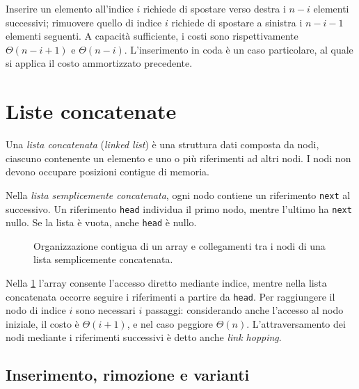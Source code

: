 Inserire un elemento all'indice \(i\) richiede di spostare verso
destra i \(n-i\) elementi successivi; rimuovere quello di indice
\(i\) richiede di spostare a sinistra i \(n-i-1\) elementi seguenti.
A capacità sufficiente, i costi sono rispettivamente
\(\Theta(n-i+1)\) e \(\Theta(n-i)\). L'inserimento in coda
è un caso particolare, al quale si applica il costo ammortizzato
precedente.

\section{Liste concatenate}
\label{sec:fi-liste-concatenate}

\begin{definition}
\label{def:fi-lista-concatenata}
Una \emph{lista concatenata} (\emph{linked list}) è una struttura
dati composta da nodi, ciascuno contenente un elemento e uno o
più riferimenti ad altri nodi. I nodi non devono occupare
posizioni contigue di memoria.
\end{definition}

Nella \emph{lista semplicemente concatenata}, ogni nodo contiene
un riferimento \texttt{next} al successivo. Un riferimento
\texttt{head} individua il primo nodo, mentre l'ultimo ha
\texttt{next} nullo. Se la lista è vuota, anche \texttt{head}
è nullo.

\begin{figure}[htbp]
  \centering
  
  \caption{Organizzazione contigua di un array e collegamenti tra
  i nodi di una lista semplicemente concatenata.}
  \label{fig:fi-array-lista-concatenata}
\end{figure}

Nella \cref{fig:fi-array-lista-concatenata} l'array consente
l'accesso diretto mediante indice, mentre nella lista concatenata
occorre seguire i riferimenti a partire da \texttt{head}.
Per raggiungere il nodo di indice \(i\) sono necessari \(i\)
passaggi: considerando anche l'accesso al nodo iniziale, il costo
è \(\Theta(i+1)\), e nel caso peggiore \(\Theta(n)\).
L'attraversamento dei nodi mediante i riferimenti successivi è
detto anche \emph{link hopping}.

\clearpage

\subsection{Inserimento, rimozione e varianti}
\label{sec:fi-liste-concatenate-operazioni}

